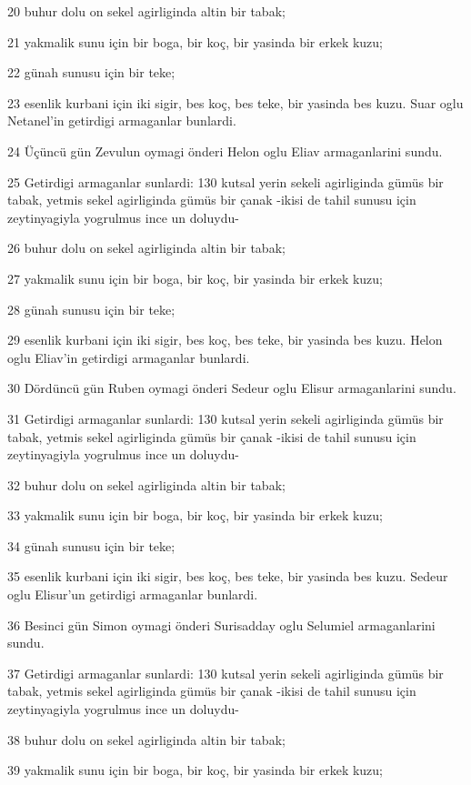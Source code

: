 \par 20 buhur dolu on sekel agirliginda altin bir tabak;
\par 21 yakmalik sunu için bir boga, bir koç, bir yasinda bir erkek kuzu;
\par 22 günah sunusu için bir teke;
\par 23 esenlik kurbani için iki sigir, bes koç, bes teke, bir yasinda bes kuzu. Suar oglu Netanel'in getirdigi armaganlar bunlardi.
\par 24 Üçüncü gün Zevulun oymagi önderi Helon oglu Eliav armaganlarini sundu.
\par 25 Getirdigi armaganlar sunlardi: 130 kutsal yerin sekeli agirliginda gümüs bir tabak, yetmis sekel agirliginda gümüs bir çanak -ikisi de tahil sunusu için zeytinyagiyla yogrulmus ince un doluydu-
\par 26 buhur dolu on sekel agirliginda altin bir tabak;
\par 27 yakmalik sunu için bir boga, bir koç, bir yasinda bir erkek kuzu;
\par 28 günah sunusu için bir teke;
\par 29 esenlik kurbani için iki sigir, bes koç, bes teke, bir yasinda bes kuzu. Helon oglu Eliav'in getirdigi armaganlar bunlardi.
\par 30 Dördüncü gün Ruben oymagi önderi Sedeur oglu Elisur armaganlarini sundu.
\par 31 Getirdigi armaganlar sunlardi: 130 kutsal yerin sekeli agirliginda gümüs bir tabak, yetmis sekel agirliginda gümüs bir çanak -ikisi de tahil sunusu için zeytinyagiyla yogrulmus ince un doluydu-
\par 32 buhur dolu on sekel agirliginda altin bir tabak;
\par 33 yakmalik sunu için bir boga, bir koç, bir yasinda bir erkek kuzu;
\par 34 günah sunusu için bir teke;
\par 35 esenlik kurbani için iki sigir, bes koç, bes teke, bir yasinda bes kuzu. Sedeur oglu Elisur'un getirdigi armaganlar bunlardi.
\par 36 Besinci gün Simon oymagi önderi Surisadday oglu Selumiel armaganlarini sundu.
\par 37 Getirdigi armaganlar sunlardi: 130 kutsal yerin sekeli agirliginda gümüs bir tabak, yetmis sekel agirliginda gümüs bir çanak -ikisi de tahil sunusu için zeytinyagiyla yogrulmus ince un doluydu-
\par 38 buhur dolu on sekel agirliginda altin bir tabak;
\par 39 yakmalik sunu için bir boga, bir koç, bir yasinda bir erkek kuzu;
